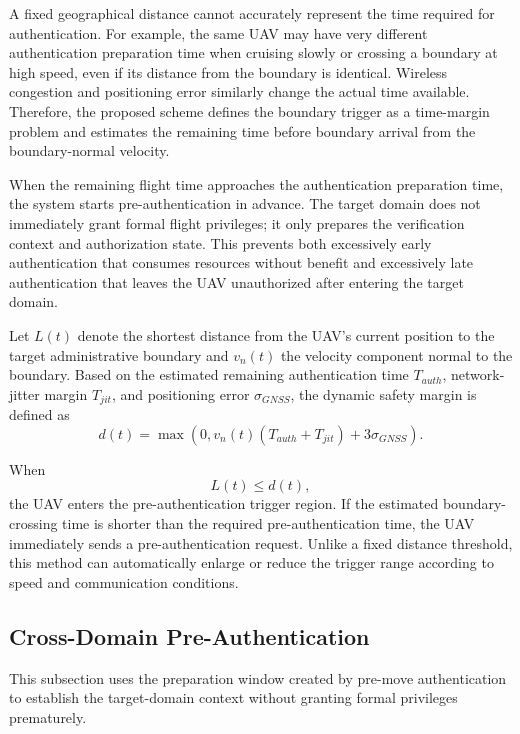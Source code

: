 \documentclass[lettersize,journal]{IEEEtran}
\begin{document}
	
	A fixed geographical distance cannot accurately represent the time required for authentication. For example, the same UAV may have very different authentication preparation time when cruising slowly or crossing a boundary at high speed, even if its distance from the boundary is identical. Wireless congestion and positioning error similarly change the actual time available. Therefore, the proposed scheme defines the boundary trigger as a time-margin problem and estimates the remaining time before boundary arrival from the boundary-normal velocity.
	
	When the remaining flight time approaches the authentication preparation time, the system starts pre-authentication in advance. The target domain does not immediately grant formal flight privileges; it only prepares the verification context and authorization state. This prevents both excessively early authentication that consumes resources without benefit and excessively late authentication that leaves the UAV unauthorized after entering the target domain.
	
	Let $L(t)$ denote the shortest distance from the UAV's current position to the target administrative boundary and $v_n(t)$ the velocity component normal to the boundary. Based on the estimated remaining authentication time $T_{auth}$, network-jitter margin $T_{jit}$, and positioning error $\sigma_{GNSS}$, the dynamic safety margin is defined as
	\begin{equation}
		d(t)=\max(0,v_n(t)(T_{auth}+T_{jit})+3\sigma_{GNSS}).
	\end{equation}
	
	When
	\begin{equation}
		L(t)\le d(t),
	\end{equation}
	the UAV enters the pre-authentication trigger region. If the estimated boundary-crossing time is shorter than the required pre-authentication time, the UAV immediately sends a pre-authentication request. Unlike a fixed distance threshold, this method can automatically enlarge or reduce the trigger range according to speed and communication conditions.
	
	\subsection{Cross-Domain Pre-Authentication}
	This subsection uses the preparation window created by pre-move authentication to establish the target-domain context without granting formal privileges prematurely.
	
\end{document}
